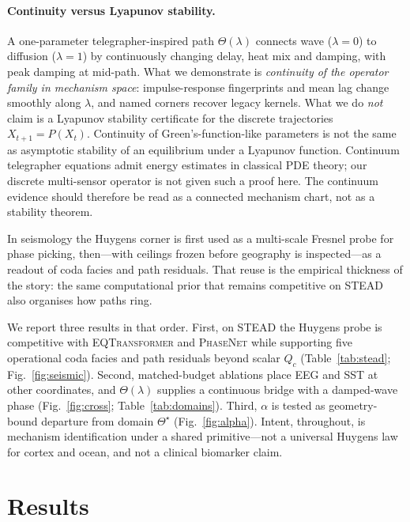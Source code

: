 \documentclass[twocolumn,10pt]{article}
\newcommand{\stead}{\textsc{STEAD}}
\newcommand{\eqt}{\textsc{EQTransformer}}
\newcommand{\pnet}{\textsc{PhaseNet}}
\begin{document}
\paragraph{Continuity versus Lyapunov stability.}
A one-parameter telegrapher-inspired path \(\Theta(\lambda)\) connects wave
(\(\lambda=0\)) to diffusion (\(\lambda=1\)) by continuously changing delay,
heat mix and damping, with peak damping at mid-path. What we demonstrate is
\emph{continuity of the operator family in mechanism space}: impulse-response
fingerprints and mean lag change smoothly along \(\lambda\), and named corners
recover legacy kernels. What we do \emph{not} claim is a Lyapunov stability
certificate for the discrete trajectories \(X_{t+1}=P(X_t)\). Continuity of
Green's-function-like parameters is not the same as asymptotic stability of an
equilibrium under a Lyapunov function. Continuum telegrapher equations admit
energy estimates in classical PDE theory; our discrete multi-sensor operator is
not given such a proof here. The continuum evidence should therefore be read as
a connected mechanism chart, not as a stability theorem.

In seismology the Huygens corner is first used as a multi-scale Fresnel probe
for phase picking, then---with ceilings frozen before geography is
inspected---as a readout of coda facies and path residuals. That reuse is the
empirical thickness of the story: the same computational prior that remains
competitive on \stead{} also organises how paths ring.

We report three results in that order. First, on \stead{} the Huygens probe is
competitive with \eqt{} and \pnet{} while supporting five operational coda facies
and path residuals beyond scalar \(Q_c\) (Table~\ref{tab:stead};
Fig.~\ref{fig:seismic}). Second, matched-budget ablations place EEG and SST at
other coordinates, and \(\Theta(\lambda)\) supplies a continuous bridge with a
damped-wave phase (Fig.~\ref{fig:cross}; Table~\ref{tab:domains}). Third,
\(\alpha\) is tested as geometry-bound departure from domain \(\Theta^{\star}\)
(Fig.~\ref{fig:alpha}). Intent, throughout, is mechanism identification under a
shared primitive---not a universal Huygens law for cortex and ocean, and not a
clinical biomarker claim.

\section*{Results}
\end{document}
